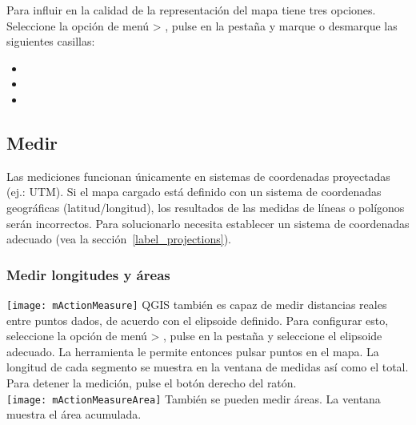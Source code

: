 \label{label_renderquality}

Para influir en la calidad de la representación del mapa tiene tres opciones. Seleccione la opción de menú
 > , pulse en la pestaña 
y marque o desmarque las siguientes casillas:

\begin{itemize}
\item {}
\item {}
\item {}
\end{itemize}


\subsection{Medir}\label{sec:measure}

Las mediciones funcionan únicamente en sistemas de coordenadas proyectadas (ej.: UTM). Si el mapa cargado
está definido con un sistema de coordenadas geográficas (latitud/longitud), los resultados de las medidas
de líneas o polígonos serán incorrectos. Para solucionarlo necesita establecer un sistema de coordenadas
adecuado (vea la sección~\ref{label_projections}).

\subsubsection{Medir longitudes y áreas}
\texttt{[image: mActionMeasure]} 
QGIS también es capaz de medir distancias reales entre puntos dados, de acuerdo con el elipsoide definido.
Para configurar esto, seleccione la opción de menú  > , 
pulse en la pestaña  y seleccione el elipsoide adecuado. La herramienta le 
permite entonces pulsar puntos en el mapa. La longitud de cada segmento se muestra en la ventana de medidas
así como el total. Para detener la medición, pulse el botón derecho del ratón. \\
\texttt{[image: mActionMeasureArea]} También se pueden medir áreas. 
La ventana muestra el área acumulada. 

